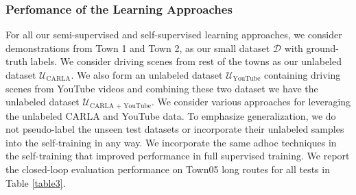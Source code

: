 \documentclass[letterpaper, 12pt]{book}
\theoremstyle{definition}
\theoremstyle{definition}
\theoremstyle{definition}
\theoremstyle{definition}
\theoremstyle{definition}
\begin{document}
\subsubsection{Perfomance of the Learning Approaches}
\label{sec:org87447f2}
For all our semi-supervised and self-supervised learning approaches, we consider
demonstrations from Town 1 and Town 2, as our small dataset \(\mathcal{D}\) with
ground-truth labels. We consider driving scenes from rest of the towns as our
unlabeled dataset \(\mathcal{U}_{\text{CARLA}}\). We also form an unlabeled dataset
\(\mathcal{U}_{\text{YouTube}}\) containing driving scenes from YouTube videos and
combining these two dataset we have the unlabeled dataset \(\mathcal{U}_{\text{CARLA +
YouTube}}\). We consider various approaches for leveraging the unlabeled CARLA
and YouTube data. To emphasize generalization, we do not pseudo-label the unseen
test datasets or incorporate their unlabeled samples into the self-training in
any way. We incorporate the same adhoc techniques in the self-training that
improved performance in full supervised training. We report the closed-loop
evaluation performance on Town05 long routes for all tests in Table
\ref{table3}.
\end{document}

